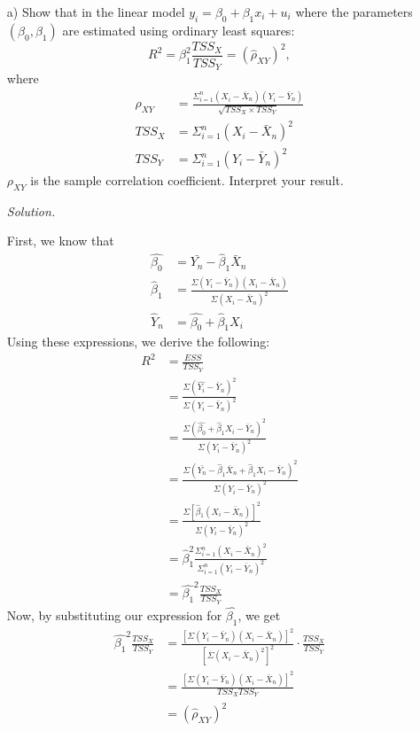 \documentclass[
]{article}
\begin{document}
\begin{enumerate}
\item[a)] Show that in the linear model $y_i = \beta_0 + \beta_1 x_i + u_i$ where the parameters $(\beta_0, \beta_1)$ are estimated using ordinary least squares: 
\[R^2 = \beta_1^2 \frac{TSS_X}{TSS_Y} = (\hat{\rho}_{XY})^2,\]
where 
\[\begin{aligned} 
\hat{\rho}_{XY} &= \frac{\Sigma_{i=1} ^ n (X_i - \bar{X}_n)(Y_i - \bar{Y}_n)}{\sqrt{TSS_X \times TSS_Y}} \\
TSS_X &= \Sigma_{i=1} ^ n (X_i - \bar{X}_n)^2 \\
TSS_Y &= \Sigma_{i=1} ^ n (Y_i - \bar{Y}_n)^2 
\end{aligned}\]
$\rho_{XY}$ is the sample correlation coefficient. Interpret your result.  
  
\textit{Solution.}  

First, we know that 
\[\begin{aligned}
\hat{\beta_0} &= \bar{Y_n} - \hat{\beta}_1 \bar{X}_n \\
\hat{\beta}_1 &= \frac{\Sigma(Y_i - \bar{Y}_n)(X_i - \bar{X}_n)}{\Sigma (X_i - \bar{X}_n)^2} \\
\hat{Y}_n &= \hat{\beta_0} + \hat{\beta}_1X_i
\end{aligned}\]
Using these expressions, we derive the following:
\[\begin{aligned}
R^2 &= \frac{ESS}{TSS_Y} \\
&= \frac{\Sigma (\hat{Y_i} - \bar{Y}_n)^2}{\Sigma(Y_i - \bar{Y}_n)^2} \\
&= \frac{\Sigma(\hat{\beta_0} + \hat{\beta}_1X_i - \bar{Y}_n)^2}{\Sigma(Y_i - \bar{Y}_n)^2} \\
&= \frac{\Sigma(\bar{Y_n} - \hat{\beta}_1 \bar{X}_n + \hat{\beta}_1X_i - \bar{Y}_n)^2}{\Sigma(Y_i - \bar{Y}_n)^2} \\
&= \frac{\Sigma [\hat{\beta}_1(   X_i - \bar{X}_n )]^2}{\Sigma(Y_i - \bar{Y}_n)^2} \\
&= \hat{\beta}_1 ^2 \frac{\Sigma_{i=1} ^ n (X_i - \bar{X}_n)^2 }{\Sigma_{i=1} ^ n (Y_i - \bar{Y}_n)^2} \\
&=  \hat{\beta_1}^2 \frac{TSS_X}{TSS_Y} 
\end{aligned}\] 
Now, by substituting our expression for $\hat{\beta_1}$, we get 
\[\begin{aligned}
\hat{\beta_1}^2 \frac{TSS_X}{TSS_Y} &= \frac{[\Sigma(Y_i - \bar{Y}_n)(X_i - \bar{X}_n)]^2}{[\Sigma (X_i - \bar{X}_n)^2]^2} \cdot  \frac{TSS_X}{TSS_Y} \\
&= \frac{[\Sigma(Y_i - \bar{Y}_n)(X_i - \bar{X}_n)]^2}{TSS_X TSS_Y} \\
&= (\hat{\rho}_{XY})^2
\end{aligned}\] 


\end{enumerate}
\end{document}
